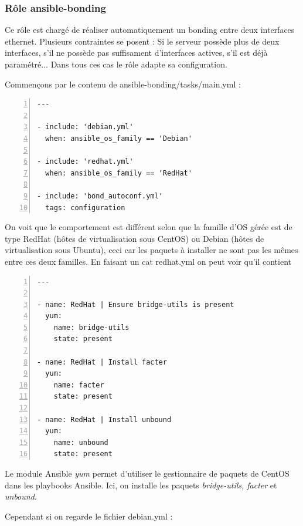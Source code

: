 \documentclass[14 pt,a4paper]{extreport}
\begin{document}
\subsubsection*{Rôle ansible-bonding}

Ce rôle est chargé de réaliser automatiquement un bonding entre deux interfaces ethernet. Plusieurs contraintes se posent : Si le serveur possède plus de deux interfaces, s'il ne possède pas suffisament d'interfaces actives, s'il est déjà paramétré... Dans tous ces cas le rôle adapte sa configuration.

Commençons par le contenu de ansible-bonding/tasks/main.yml :

\begin{framed}
\begin{Verbatim}[fontsize=\scriptsize,numbers=left]
---

- include: 'debian.yml'
  when: ansible_os_family == 'Debian'

- include: 'redhat.yml'
  when: ansible_os_family == 'RedHat'

- include: 'bond_autoconf.yml'
  tags: configuration

\end{Verbatim}
\end{framed}

On voit que le comportement est différent selon que la famille d'OS gérée est de type RedHat (hôtes de virtualisation sous CentOS) ou Debian (hôtes de virtualisation sous Ubuntu), ceci car les paquets à installer ne sont pas les mêmes entre ces deux familles. En faisant un cat redhat.yml on peut voir qu'il contient 

\begin{framed}
\begin{Verbatim}[fontsize=\scriptsize,numbers=left]
---

- name: RedHat | Ensure bridge-utils is present
  yum:
    name: bridge-utils
    state: present

- name: RedHat | Install facter
  yum:
    name: facter
    state: present

- name: RedHat | Install unbound
  yum:
    name: unbound
    state: present
\end{Verbatim}
\end{framed}

Le module Ansible \emph{yum} permet d'utiliser le gestionnaire de paquets de CentOS dans les playbooks Ansible. Ici, on installe les paquets \emph{bridge-utils, facter} et \emph{unbound}.

Cependant si on regarde le fichier debian.yml :
\end{document}
